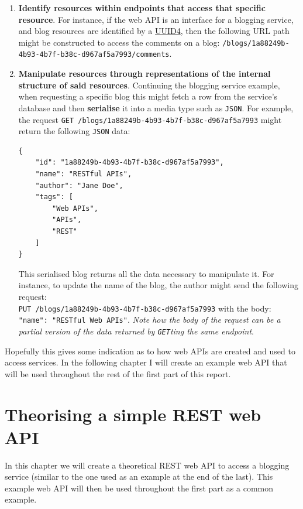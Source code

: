 \documentclass[]{full}
\theoremstyle{definition}
\begin{document}
\begin{enumerate}
    \item \textbf{Identify resources within endpoints that access that specific resource}. For instance, if the web API is an interface for a blogging service, and blog resources are identified by a \href{https://www.uuidgenerator.net/version4}{UUID4}, then the following URL path might be constructed to access the comments on a blog: \verb|/blogs/1a88249b-4b93-4b7f-b38c-d967af5a7993/comments|.
    \item \textbf{Manipulate resources through representations of the internal structure of said resources}. Continuing the blogging service example, when requesting a specific blog this might fetch a row from the service's database and then \textbf{serialise} it into a media type such as \verb|JSON|. For example, the request \verb|GET /blogs/1a88249b-4b93-4b7f-b38c-d967af5a7993| might return the following \verb|JSON| data:
    \begin{verbatim}
{
    "id": "1a88249b-4b93-4b7f-b38c-d967af5a7993",
    "name": "RESTful APIs",
    "author": "Jane Doe",
    "tags": [
        "Web APIs",
        "APIs",
        "REST"
    ]
}    
    \end{verbatim}
    This serialised blog returns all the data necessary to manipulate it. For instance, to update the name of the blog, the author might send the following request: \\\verb|PUT /blogs/1a88249b-4b93-4b7f-b38c-d967af5a7993| with the body: \texttt{{"name": "RESTful Web APIs"}}. \cprotect\textit{Note how the body of the request can be a partial version of the data returned by \verb|GET|ting the same endpoint}.
\end{enumerate}

Hopefully this gives some indication as to how web APIs are created and used to access services. In the following chapter I will create an example web API that will be used throughout the rest of the first part of this report.

\chapter{Theorising a simple REST web API}

In this chapter we will create a theoretical REST web API to access a blogging service (similar to the one used as an example at the end of the last). This example web API will then be used throughout the first part as a common example.
\end{document}
